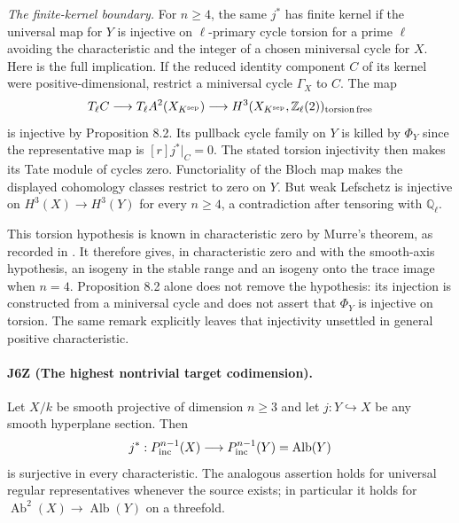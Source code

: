 \emph{The finite-kernel boundary.}
For $n\geq4$, the same $j^*$ has finite kernel if the universal
map for $Y$ is injective on $\ell$-primary cycle torsion for a
prime $\ell$ avoiding the characteristic and the integer of a
chosen miniversal cycle for $X$. Here is the full implication.
If the reduced identity component $C$ of its kernel were
positive-dimensional, restrict a miniversal cycle $\Gamma_X$
to $C$. The map
\[
 T_\ell C\longrightarrow T_\ell A^2(X_{K^{\rm sep}})
 \longrightarrow H^3(X_{K^{\rm sep}},\mathbb Z_\ell(2))_{
 \rm torsion\,free}
\]
is injective by Proposition 8.2. Its pullback cycle family on
$Y$ is killed by $\Phi_Y$ since the representative map is
$[r]j^*|_C=0$. The stated torsion injectivity then makes its
Tate module of cycles zero. Functoriality of the Bloch map
\cite[Section 8.1, pp.~30--31]{DGJ_ACMVFunctor} makes the
displayed cohomology classes restrict to zero on $Y$. But weak
Lefschetz is injective on $H^3(X)\to H^3(Y)$ for every $n\geq4$,
a contradiction after tensoring with $\mathbb Q_\ell$.

This torsion hypothesis is known in characteristic zero by
Murre's theorem, as recorded in
\cite[Remark 8.6, p.~33]{DGJ_ACMVFunctor}. It therefore gives,
in characteristic zero and with the smooth-axis hypothesis,
an isogeny in the stable range and an isogeny onto the trace
image when $n=4$. Proposition 8.2 alone does not remove the
hypothesis: its injection is constructed from a miniversal
cycle and does not assert that $\Phi_Y$ is injective on torsion.
The same remark explicitly leaves that injectivity unsettled
in general positive characteristic.

\paragraph{J6Z (The highest nontrivial target codimension).}
Let $X/k$ be smooth projective of dimension $n\geq3$ and let
$j:Y\hookrightarrow X$ be any smooth hyperplane section. Then
\[
 j^*:P^{n-1}_{\rm inc}(X)\longrightarrow
       P^{n-1}_{\rm inc}(Y)=\operatorname{Alb}(Y)
\]
is surjective in every characteristic. The analogous assertion
holds for universal regular representatives whenever the source
exists; in particular it holds for
$\operatorname{Ab}^2(X)\to\operatorname{Alb}(Y)$ on a threefold.

